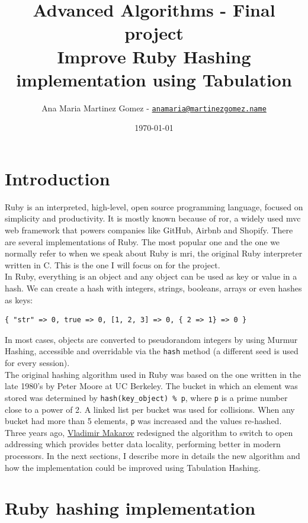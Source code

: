 \documentclass[oneside, 12pt]{article}
\title{Advanced Algorithms - Final project\\
       \vspace{3mm}\Large{Improve Ruby Hashing implementation using Tabulation}}
\author{Ana Maria Martinez Gomez - \texttt{\href{mailto:anamaria@martinezgomez.name}{anamaria@martinezgomez.name}}}
\date{\today}
\theoremstyle{break}
\begin{document}
\maketitle
\section{Introduction}

Ruby is an interpreted, high-level, open source programming language, focused on simplicity and productivity.
It is mostly known because of \acrfull{ror}, a widely used \acrshort{mvc} web framework that powers companies like GitHub, Airbnb and Shopify. There are several implementations of Ruby.
The most popular one and the one we normally refer to when we speak about Ruby is \acrshort{mri}, the original Ruby interpreter written in C.
This is the one I will focus on for the project.\\


In Ruby, everything is an object and any object can be used as key or value in a hash.
We can create a hash with integers, strings, booleans, arrays or even hashes as keys:

\begin{lstlisting}
{ "str" => 0, true => 0, [1, 2, 3] => 0, { 2 => 1} => 0 }
\end{lstlisting}

In most cases, objects are converted to pseudorandom integers by using Murmur Hashing, accessible and overridable via the \lstinline{hash} method (a different seed is used for every session).\\

The original hashing algorithm used in Ruby was based on the one written in the late 1980's by Peter Moore at UC Berkeley.
The bucket in which an element was stored was determined by \lstinline{hash(key_object) % p}, where \lstinline{p} is a prime number close to a power of 2.
A linked list per bucket was used for collisions.
When any bucket had more than 5 elements, \lstinline{p} was increased and the values re-hashed.
Three years ago, \href{https://github.com/vnmakarov}{Vladimir Makarov} redesigned the algorithm to switch to open addressing which provides better data locality, performing better in modern processors.
In the next sections, I describe more in details the new algorithm and how the implementation could be improved using Tabulation Hashing.

\section{Ruby hashing implementation}
\end{document}
